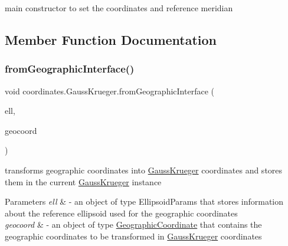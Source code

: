 main constructor to set the coordinates and reference meridian 



\subsection{Member Function Documentation}
\mbox{\label{classcoordinates_1_1_gauss_krueger_ab7f6aa06c6d9e4ce8216edda33143458}} 
\subsubsection{\texorpdfstring{from\+Geographic\+Interface()}{fromGeographicInterface()}}
{\footnotesize\ttfamily void coordinates.\+Gauss\+Krueger.\+from\+Geographic\+Interface (\begin{DoxyParamCaption}\item[{\hyperlink{classparams_1_1_ellipsoid_parms}{Ellipsoid\+Parms}}]{ell,  }\item[{\hyperlink{classcoordinates_1_1_geographic_coordinate_interface}{Geographic\+Coordinate\+Interface}}]{geocoord }\end{DoxyParamCaption})}



transforms geographic coordinates into \hyperlink{classcoordinates_1_1_gauss_krueger}{Gauss\+Krueger} coordinates and stores them in the current \hyperlink{classcoordinates_1_1_gauss_krueger}{Gauss\+Krueger} instance 


\begin{DoxyParams}{Parameters}
{\em ell} & -\/ an object of type Ellipsoid\+Params that stores information about the reference ellipsoid used for the geographic coordinates \\
\hline
{\em geocoord} & -\/ an object of type \hyperlink{classcoordinates_1_1_geographic_coordinate}{Geographic\+Coordinate} that contains the geographic coordinates to be transformed in \hyperlink{classcoordinates_1_1_gauss_krueger}{Gauss\+Krueger} coordinates \\
\hline
\end{DoxyParams}
\mbox{\label{classcoordinates_1_1_gauss_krueger_a3b7d9043de1a8cbff07dd692244938d5}} 
